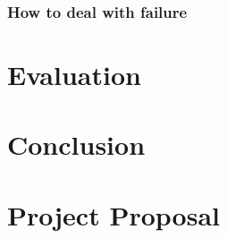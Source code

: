 \documentclass[12pt,a4paper,twoside,openright]{report}
\begin{document}
			\subsection*{How to deal with failure}

	\chapter{Evaluation}
	
	\chapter{Conclusion}
	
	
	
	
	
	\appendix

	\chapter{Project Proposal}
	
	
	
	
\end{document}
